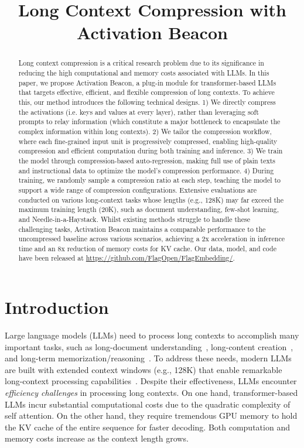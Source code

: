 \title{Long Context Compression with Activation Beacon}

\begin{abstract}
Long context compression is a critical research problem due to its significance in reducing the high computational and memory costs associated with LLMs. In this paper, we propose Activation Beacon, a plug-in module for transformer-based LLMs that targets effective, efficient, and flexible compression of long contexts. To achieve this, our method introduces the following technical designs. 1) We directly compress the activations (i.e. keys and values at every layer), rather than leveraging soft prompts to relay information (which constitute a major bottleneck to encapsulate the complex information within long contexts). 2) We tailor the compression workflow, where each fine-grained input unit is progressively compressed, enabling high-quality compression and efficient computation during both training and inference. 3) We train the model through compression-based auto-regression, making full use of plain texts and instructional data to optimize the model's compression performance. 4) During training, we randomly sample a compression ratio at each step, teaching the model to support a wide range of compression configurations. Extensive evaluations are conducted on various long-context tasks whose lengths (e.g., 128K) may far exceed the maximum training length (20K), such as document understanding, few-shot learning, and Needle-in-a-Haystack. Whilst existing methods struggle to handle these challenging tasks, Activation Beacon maintains a comparable performance to the uncompressed baseline across various scenarios, achieving a 2x acceleration in inference time and an 8x reduction of memory costs for KV cache. Our data, model, and code have been released at \url{https://github.com/FlagOpen/FlagEmbedding/}.
\end{abstract}

\section{Introduction}

Large language models (LLMs) need to process long contexts to accomplish many important tasks, such as long-document understanding~\citep{jiang2024longrag}, long-content creation~\citep{bai2024longwriter}, and long-term memorization/reasoning~\citep{zhang2024agent_survey}. To address these needs, modern LLMs are built with extended context windows (e.g., 128K) that enable remarkable long-context processing capabilities~\citep{gpt4,qwen2,llama3}. Despite their effectiveness, LLMs encounter \textit{efficiency challenges} in processing long contexts. On one hand, transformer-based LLMs incur substantial computational costs due to the quadratic complexity of self attention. On the other hand, they require tremendous GPU memory to hold the KV cache of the entire sequence for faster decoding. Both computation and memory costs increase as the context length grows. 

